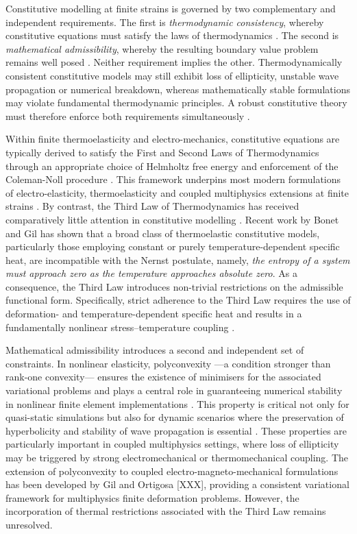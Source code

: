 


Constitutive modelling at finite strains is governed by two complementary and independent requirements. The first is \emph{thermodynamic consistency}, whereby constitutive equations must satisfy the laws of thermodynamics \cite{Gurtin2010,BonetGil2026}. The second is \emph{mathematical admissibility}, whereby the resulting boundary value problem remains well posed \cite{Ball_1976,Silhavy1997}. Neither requirement implies the other. Thermodynamically consistent constitutive models may still exhibit loss of ellipticity, unstable wave propagation or numerical breakdown, whereas mathematically stable formulations may violate fundamental thermodynamic principles. A robust constitutive theory must therefore enforce both requirements simultaneously \cite{Holzapfel2000}.

Within finite thermoelasticity and electro-mechanics, constitutive equations are typically derived to satisfy the First and Second Laws of Thermodynamics through an appropriate choice of Helmholtz free energy and enforcement of the Coleman-Noll procedure \cite{ColemanNoll1963}. This framework underpins most modern formulations of electro-elasticity, thermoelasticity and coupled multiphysics extensions at finite strains \cite{Miehe1994,HolzapfelSimo1996}. By contrast, the Third Law of Thermodynamics has received comparatively little attention in constitutive modelling \cite{Govindjee2024,Bonet2021first}. Recent work by Bonet and Gil \cite{BonetGil2026} has shown that a broad class of thermoelastic constitutive models, particularly those employing constant or purely temperature-dependent specific heat, are incompatible with the Nernst postulate, namely, \emph{the entropy of a system must approach zero as the temperature approaches absolute zero}. As a consequence, the Third Law introduces non-trivial restrictions on the admissible functional form. Specifically, strict adherence to the Third Law requires the use of deformation- and temperature-dependent specific heat and results in a fundamentally nonlinear stress–temperature coupling \cite{Bonet2021first,Simavilla2018}.

Mathematical admissibility introduces a second and independent set of constraints. In nonlinear elasticity, polyconvexity \cite{Ball_1976} —a condition stronger than rank-one convexity— ensures the existence of minimisers for the associated variational problems and plays a central role in guaranteeing numerical stability in nonlinear finite element implementations \cite{Bonet_book_statics,Bonet_polyconvexity_2015}. This property is critical not only for quasi-static simulations but also for dynamic scenarios where the preservation of hyperbolicity and stability of wave propagation is essential \cite{Bonet2021first}. These properties are particularly important in coupled multiphysics settings, where loss of ellipticity may be triggered by strong electromechanical or thermomechanical coupling. The extension of polyconvexity to coupled electro-magneto-mechanical formulations has been developed by Gil and Ortigosa [XXX], providing a consistent variational framework for multiphysics finite deformation problems. However, the incorporation of thermal restrictions associated with the Third Law remains unresolved.

